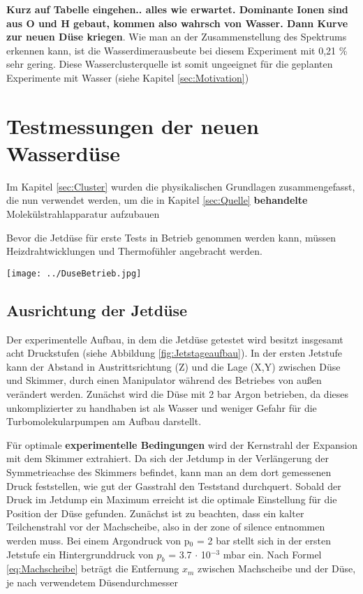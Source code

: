 \textbf{Kurz auf Tabelle eingehen.. alles wie erwartet. Dominante Ionen sind aus O und H gebaut, kommen also wahrsch von Wasser. Dann Kurve zur neuen Düse kriegen}.
Wie man an der Zusammenstellung des Spektrums erkennen kann, ist die Wasserdimerausbeute bei diesem Experiment mit 0,21 \% sehr gering. Diese Wasserclusterquelle ist somit ungeeignet für die geplanten Experimente mit Wasser (siehe Kapitel \ref{sec:Motivation})

\section{Testmessungen der neuen Wasserdüse}

Im Kapitel \ref{sec:Cluster} wurden die physikalischen Grundlagen zusammengefasst, die nun verwendet werden, um die in Kapitel \ref{sec:Quelle} \textbf{behandelte} Molekülstrahlapparatur aufzubauen

Bevor die Jetdüse für erste Tests in Betrieb genommen werden kann, müssen Heizdrahtwicklungen und Thermofühler angebracht werden.

\begin{center}
\begin{minipage}{\linewidth}
\centering
\texttt{[image: ../DuseBetrieb.jpg]}%
 \label{fig:DuseBetrieb}
\end{minipage} 
\end{center} 

\subsection{Ausrichtung der Jetdüse}

Der experimentelle Aufbau, in dem die Jetdüse getestet wird besitzt insgesamt acht Druckstufen (siehe Abbildung \ref{fig:Jetstageaufbau}). In der ersten Jetstufe kann der Abstand in Austrittsrichtung (Z) und die Lage (X,Y) zwischen Düse und Skimmer, durch einen Manipulator während des Betriebes von außen verändert werden. Zunächst wird die Düse mit 2 bar Argon betrieben, da dieses unkomplizierter zu handhaben ist als Wasser und weniger Gefahr für die Turbomolekularpumpen am Aufbau darstellt. 

Für optimale \textbf{experimentelle Bedingungen} wird der Kernstrahl der Expansion mit dem Skimmer extrahiert. Da sich der Jetdump in der Verlängerung der Symmetrieachse des Skimmers befindet, kann man an dem dort gemessenen Druck feststellen, wie gut der Gasstrahl den Teststand durchquert.
Sobald der Druck im Jetdump ein Maximum erreicht ist die optimale Einstellung für die Position der Düse gefunden. Zunächst ist zu beachten, dass ein kalter Teilchenstrahl vor der Machscheibe, also in der zone of silence entnommen werden muss.
Bei einem Argondruck von p$_0$ = 2 bar stellt sich in der ersten Jetstufe ein Hintergrunddruck von $p_b$ = 3.7 $\cdot$ 10$^{-3}$ mbar ein. Nach Formel \ref{eq:Machscheibe} beträgt die Entfernung $x_m$ zwischen Machscheibe und der Düse, je nach verwendetem Düsendurchmesser

